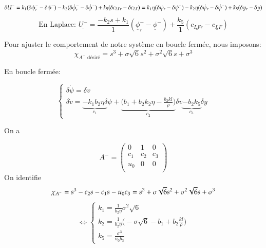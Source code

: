 \documentclass{report}
\begin{document}
\begin{equation*}
    \delta U^- = k_1(\delta \phi^-_r - \delta \phi^-)
    - k_2(\delta \dot{\phi}^-_r - \delta \dot{\phi}^-)
    + k_5(\delta c_{LFr} - \delta c_{LF}) \\
    = k_1 \eta(\delta \psi_r - \delta \psi^-)
    - k_2 \eta(\delta \dot{\psi}_r - \delta \dot{\psi}^-)
    + k_5(\delta y_r - \delta y) \\
\end{equation*}
\begin{equation*}
    \text{En Laplace: }
    \underline{U^-} = \frac{-k_2s + k_1}{1}
    (\underline{\phi}^-_r - \underline{\phi}^-)
    + \frac{k_5}{1}
    (\underline{c_{LFr}} - \underline{c_{LF}})    
\end{equation*}

Pour ajuster le comportement de notre système en boucle fermée, nous 
imposons:
\begin{equation*}
    \chi_{A^- \text{ désiré}} = s^3 + \sigma\sqrt{6}s^2 
    + \sigma^2\sqrt{6}s + \sigma^3 
\end{equation*}

En boucle fermée:

\begin{equation*}
    \begin{cases}
        \delta \dot{\psi} = \delta v \\
        \delta \dot{v} = \underbrace{-k_1b_2\eta\delta}_{c_1} \psi + 
        \underbrace{\big(b_1 + b_2k_2\eta - \frac{b_2kl}{\rho} \big)}_{c_2}\delta v 
        \underbrace{- b_2k_5}_{c_3} \delta y
    \end{cases}
\end{equation*}

On a

\begin{equation*}
    A^-=
    \begin{pmatrix}
        0 & 1 & 0 \\
        c_1 & c_2 & c_3 \\
        u_0 & 0 & 0 \\
    \end{pmatrix}
\end{equation*}
 On identifie
 \begin{equation*}
    \chi_{A^-} = s^3 - c_2s - c_1s - u_0c_3
    = s^3 + \sigma\sqrt{6}s^2 
    + \sigma^2\sqrt{6}s + \sigma^3 \\    
 \end{equation*}
 \begin{equation*}
    \Leftrightarrow
    \begin{cases}
        k_1 = \frac{1}{b_2\eta}\sigma^2\sqrt{6}  \\
        k_2 = \frac{1}{b_2\eta}\big(-\sigma\sqrt{6} - b_1 + b_2\frac{kl}{\rho} \big) \\
        k_5 = \frac{\sigma^3}{u_0b_3}  
    \end{cases}
 \end{equation*}
\end{document}
